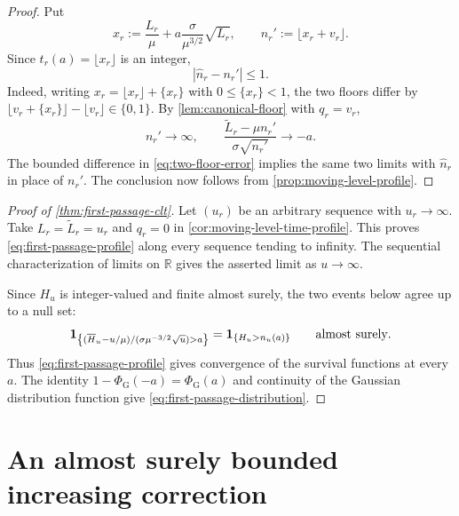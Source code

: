 \documentclass[10pt,reqno,a4paper]{amsart}
\numberwithin{equation}{section}
\theoremstyle{plain}
\theoremstyle{definition}
\theoremstyle{remark}
\newcommand{\R}{\mathbb{R}}
\newcommand{\1}{\mathbf{1}}
\newcommand{\abs}[1]{\left|#1\right|}
\begin{document}
\begin{proof}
  Put
  \begin{equation*}
    x_r
    :=
    \frac{L_r}{\mu}
    +a\frac{\sigma}{\mu^{3/2}}\sqrt{L_r},
    \qquad
    n_r':=\lfloor x_r+v_r\rfloor.
  \end{equation*}
  Since $t_r(a)=\lfloor x_r\rfloor$ is an integer,
  \begin{equation}\label{eq:two-floor-error}
    \abs{\widehat n_r-n_r'}\leq1.
  \end{equation}
  Indeed, writing $x_r=\lfloor x_r\rfloor+\{x_r\}$ with
  $0\leq\{x_r\}<1$, the two floors differ by
  $\lfloor v_r+\{x_r\}\rfloor-\lfloor v_r\rfloor\in\{0,1\}$.
  By \cref{lem:canonical-floor} with $q_r=v_r$,
  \begin{equation*}
    n_r'\longrightarrow\infty,
    \qquad
    \frac{\widetilde L_r-\mu n_r'}{\sigma\sqrt{n_r'}}
    \longrightarrow-a.
  \end{equation*}
  The bounded difference in \cref{eq:two-floor-error} implies the same two
  limits with $\widehat n_r$ in place of $n_r'$.  The conclusion now follows
  from \cref{prop:moving-level-profile}.
\end{proof}

\begin{proof}[Proof of \cref{thm:first-passage-clt}]
  Let $(u_r)$ be an arbitrary sequence with $u_r\to\infty$.  Take
  $L_r=\widetilde L_r=u_r$ and $q_r=0$ in
  \cref{cor:moving-level-time-profile}.  This proves
  \cref{eq:first-passage-profile} along every sequence tending to infinity.
  The sequential characterization of limits on $\R$ gives the asserted
  limit as $u\to\infty$.

  Since $H_u$ is integer-valued and finite almost surely, the two events
  below agree up to a null set:
  \begin{equation*}
    \1_{\left\{
        (\overline H_u-u/\mu)/(\sigma\mu^{-3/2}\sqrt u)>a
      \right\}}
    =
    \1_{\{H_u>n_u(a)\}}
    \qquad\hbox{almost surely}.
  \end{equation*}
  Thus \cref{eq:first-passage-profile} gives convergence of the survival
  functions at every $a$.  The identity
  $1-\Phi_{\mathrm G}(-a)=\Phi_{\mathrm G}(a)$ and continuity of the Gaussian
  distribution function give \cref{eq:first-passage-distribution}.
\end{proof}

\section{An almost surely bounded increasing correction}
\label{sec:bounded-correction}
\end{document}
